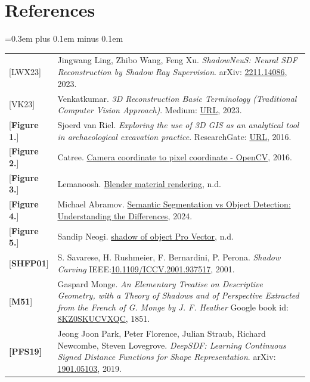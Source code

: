\documentclass[12pt,a4paper]{article}
\theoremstyle{definition}
\begin{document}
\section*{References}
\spaceskip=0.3em plus 0.1em minus 0.1em
\begin{tabular}{p{}p{}}
{[LWX23]}               & Jingwang Ling, Zhibo Wang, Feng Xu. \textit{ShadowNeuS: Neural SDF Reconstruction by Shadow Ray Supervision}. arXiv: \href{https://arxiv.org/abs/2211.14086}{2211.14086}, 2023. \hypertarget{[LWX23]}{}  \\
{[VK23]}                & Venkatkumar. \textit{3D Reconstruction Basic Terminology (Traditional Computer Vision Approach)}. Medium: \href{https://medium.com/@VK_Venkatkumar/3d-reconstruction-basic-terminology-traditional-computer-vision-e148496f389}{URL}, 2023. \hypertarget{[VK23]}{} \\
{[\textbf{Figure 1.}]}  & Sjoerd van Riel. \textit{Exploring the use of 3D GIS as an analytical tool in archaeological excavation practice}. ResearchGate: \href{https://www.researchgate.net/figure/Structure-from-Motion-SfM-photogrammetric-principle-Source-Theia-sfmorg-2016_fig3_303824023}{URL}, 2016. \hypertarget{[Fig 1]}{} \\
{[\textbf{Figure 2.}]}  & Catree. \href{https://stackoverflow.com/questions/38494485/camera-coordinate-to-pixel-coordinate-opencv}{Camera coordinate to pixel coordinate - OpenCV}, 2016. \hypertarget{[Fig 2]}{} \\
{[\textbf{Figure 3.}]}  & Lemanoosh. \href{https://lemanoosh.com/online-course-blender-material-rendering/}{Blender material rendering}, n.d. \hypertarget{[Fig 3]}{}  \\
{[\textbf{Figure 4.}]}  & Michael Abramov. \href{https://keymakr.com/blog/semantic-segmentation-vs-object-detection-understanding-the-differences/}{Semantic Segmentation vs Object Detection: Understanding the Differences}, 2024. \hypertarget{[Fig 4]}{}  \\
{[\textbf{Figure 5.}]}  & Sandip Neogi. \href{https://www.vecteezy.com/vector-art/42399612-shadow-of-object}{shadow of object Pro Vector}, n.d. \hypertarget{[Fig 5]}{}  \\
{[\textbf{SHFP01}]}     & S. Savarese, H. Rushmeier, F. Bernardini, P. Perona. \textit{Shadow Carving} IEEE:\href{https://ieeexplore.ieee.org/document/937517}{10.1109/ICCV.2001.937517}, 2001. \hypertarget{[SHFP01]}{}  \\
{[\textbf{M51}]}        & Gaspard Monge. \textit{An Elementary Treatise on Descriptive Geometry, with a Theory of Shadows and of Perspective Extracted from the French of G. Monge by J. F. Heather} Google book id: \href{https://archive.org/details/bub_gb_8KZ0SKUCVXQC/page/n17/mode/2up}{8KZ0SKUCVXQC}, 1851. \hypertarget{[M51]}{}  \\
{\textbf{[PFS19]}}      & Jeong Joon Park, Peter Florence, Julian Straub, Richard Newcombe, Steven Lovegrove. \textit{DeepSDF: Learning Continuous Signed Distance Functions for Shape Representation}. arXiv: \href{https://arxiv.org/abs/1901.05103}{1901.05103}, 2019. \hypertarget{[PFS19]}{}\\
\end{tabular}
\end{document}

